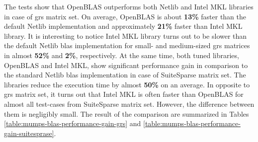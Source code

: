 The tests show that OpenBLAS outperforms both Netlib and Intel MKL libraries in case of \acrshort{grs} matrix set. On average, OpenBLAS is about \textbf{13\%} faster than the default Netlib implementation and approximately \textbf{21\%} faster than Intel MKL library. It is interesting to notice Intel MKL library turns out to be slower than the default Netlib \acrshort{blas} implementation for small- and medium-sized \acrshort{grs} matrices in almost \textbf{52\%} and \textbf{2\%}, respectively. At the same time, both tuned libraries, OpenBLAS and Intel MKL, show significant performance gain in comparison to the standard Netlib \acrshort{blas} implementation in case of SuiteSparse matrix set. The libraries reduce the execution time by almost \textbf{50\%} on an average. In opposite to \acrshort{grs} matrix set, it turns out that Intel MKL is often faster than OpenBLAS for almost all test-cases from SuiteSparse matrix set. However, the difference between them is negligibly small. The result of the comparison are summarized in Tables \ref{table:mumps-blas-performance-gain-grs} and \ref{table:mumps-blas-performance-gain-suitesprase}.\\


